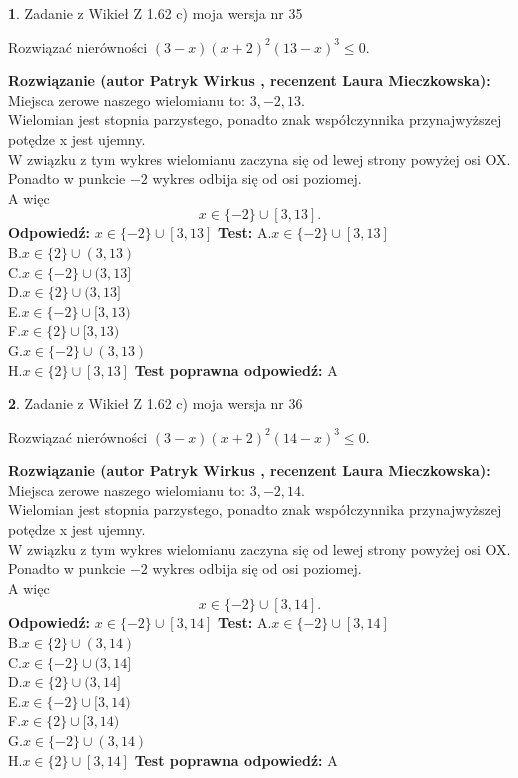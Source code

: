 \documentclass[12pt, a4paper]{article}
\theoremstyle{definition} %
\newtheorem{zad}{}
\newcommand{\zadStart}[1]{\begin{zad}#1\newline}
\newcommand{\zadStop}{\end{zad}}
\newcommand{\rozwStart}[2]{\noindent \textbf{Rozwiązanie (autor #1 , recenzent #2): }\newline}
\newcommand{\rozwStop}{\newline}
\newcommand{\odpStart}{\noindent \textbf{Odpowiedź:}\newline}
\newcommand{\odpStop}{\newline}
\newcommand{\testStart}{\noindent \textbf{Test:}\newline}
\newcommand{\testStop}{\newline}
\newcommand{\kluczStart}{\noindent \textbf{Test poprawna odpowiedź:}\newline}
\newcommand{\kluczStop}{\newline}
\begin{document}
\zadStart{Zadanie z Wikieł Z 1.62 c) moja wersja nr 35}

Rozwiązać nierówności $(3-x)(x+2)^{2}(13-x)^{3}\le0$.
\zadStop
\rozwStart{Patryk Wirkus}{Laura Mieczkowska}
Miejsca zerowe naszego wielomianu to: $3, -2, 13$.\\
Wielomian jest stopnia parzystego, ponadto znak współczynnika przy\linebreak najwyższej potędze x jest ujemny.\\ W związku z tym wykres wielomianu zaczyna się od lewej strony powyżej osi OX.\\
Ponadto w punkcie $-2$ wykres odbija się od osi poziomej.\\
A więc $$x \in \{-2\} \cup [3,13].$$
\rozwStop
\odpStart
$x \in \{-2\} \cup [3,13]$
\odpStop
\testStart
A.$x \in \{-2\} \cup [3,13]$\\
B.$x \in \{2\} \cup (3,13)$\\
C.$x \in \{-2\} \cup (3,13]$\\
D.$x \in \{2\} \cup (3,13]$\\
E.$x \in \{-2\} \cup [3,13)$\\
F.$x \in \{2\} \cup [3,13)$\\
G.$x \in \{-2\} \cup (3,13)$\\
H.$x \in \{2\} \cup [3,13]$
\testStop
\kluczStart
A
\kluczStop



\zadStart{Zadanie z Wikieł Z 1.62 c) moja wersja nr 36}

Rozwiązać nierówności $(3-x)(x+2)^{2}(14-x)^{3}\le0$.
\zadStop
\rozwStart{Patryk Wirkus}{Laura Mieczkowska}
Miejsca zerowe naszego wielomianu to: $3, -2, 14$.\\
Wielomian jest stopnia parzystego, ponadto znak współczynnika przy\linebreak najwyższej potędze x jest ujemny.\\ W związku z tym wykres wielomianu zaczyna się od lewej strony powyżej osi OX.\\
Ponadto w punkcie $-2$ wykres odbija się od osi poziomej.\\
A więc $$x \in \{-2\} \cup [3,14].$$
\rozwStop
\odpStart
$x \in \{-2\} \cup [3,14]$
\odpStop
\testStart
A.$x \in \{-2\} \cup [3,14]$\\
B.$x \in \{2\} \cup (3,14)$\\
C.$x \in \{-2\} \cup (3,14]$\\
D.$x \in \{2\} \cup (3,14]$\\
E.$x \in \{-2\} \cup [3,14)$\\
F.$x \in \{2\} \cup [3,14)$\\
G.$x \in \{-2\} \cup (3,14)$\\
H.$x \in \{2\} \cup [3,14]$
\testStop
\kluczStart
A
\kluczStop
\end{document}

